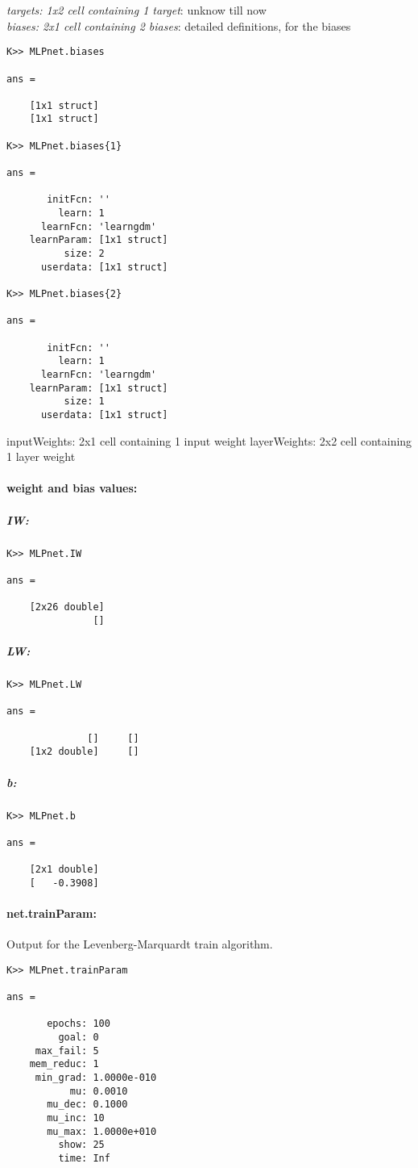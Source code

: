 \noindent \textit{targets: {1x2 cell} containing 1 target}: unknow till now\\

\noindent \textit{biases: {2x1 cell} containing 2 biases}: detailed definitions, for the biases\\
\begin{verbatim}
K>> MLPnet.biases

ans = 

    [1x1 struct]
    [1x1 struct]

K>> MLPnet.biases{1}

ans = 

       initFcn: ''
         learn: 1
      learnFcn: 'learngdm'
    learnParam: [1x1 struct]
          size: 2
      userdata: [1x1 struct]

K>> MLPnet.biases{2}

ans = 

       initFcn: ''
         learn: 1
      learnFcn: 'learngdm'
    learnParam: [1x1 struct]
          size: 1
      userdata: [1x1 struct]
\end{verbatim}
      inputWeights: {2x1 cell} containing 1 input weight
      layerWeights: {2x2 cell} containing 1 layer weight


\paragraph{weight and bias values:}

\subparagraph{IW:}
\begin{verbatim}
K>> MLPnet.IW

ans = 

    [2x26 double]
               []
\end{verbatim}

\subparagraph{LW:}
\begin{verbatim}
K>> MLPnet.LW

ans = 

              []     []
    [1x2 double]     []
\end{verbatim}

\subparagraph{b:}
\begin{verbatim}
K>> MLPnet.b

ans = 

    [2x1 double]
    [   -0.3908]
\end{verbatim}


\paragraph{net.trainParam:}
Output for the Levenberg-Marquardt train algorithm.
\begin{verbatim}
K>> MLPnet.trainParam

ans = 

       epochs: 100
         goal: 0
     max_fail: 5
    mem_reduc: 1
     min_grad: 1.0000e-010
           mu: 0.0010
       mu_dec: 0.1000
       mu_inc: 10
       mu_max: 1.0000e+010
         show: 25
         time: Inf
\end{verbatim}